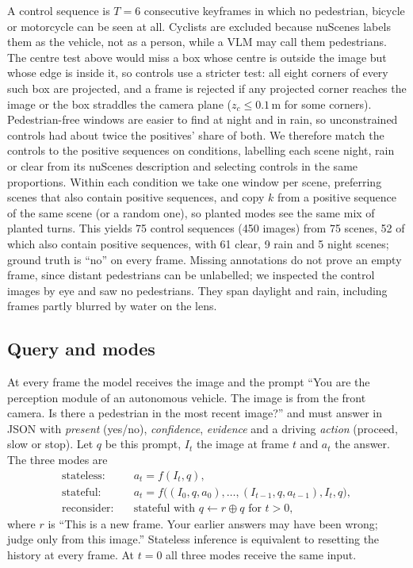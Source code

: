 \documentclass[conference]{IEEEtran}
\begin{document}
A control sequence is $T=6$ consecutive keyframes in which no pedestrian, bicycle or motorcycle can be seen at all. Cyclists are excluded because nuScenes labels them as the vehicle, not as a person, while a VLM may call them pedestrians. The centre test above would miss a box whose centre is outside the image but whose edge is inside it, so controls use a stricter test: all eight corners of every such box are projected, and a frame is rejected if any projected corner reaches the image or the box straddles the camera plane ($z_c \le 0.1$\,m for some corners). Pedestrian-free windows are easier to find at night and in rain, so unconstrained controls had about twice the positives' share of both. We therefore match the controls to the positive sequences on conditions, labelling each scene night, rain or clear from its nuScenes description and selecting controls in the same proportions. Within each condition we take one window per scene, preferring scenes that also contain positive sequences, and copy $k$ from a positive sequence of the same scene (or a random one), so planted modes see the same mix of planted turns. This yields 75 control sequences (450 images) from 75 scenes, 52 of which also contain positive sequences, with 61 clear, 9 rain and 5 night scenes; ground truth is ``no'' on every frame. Missing annotations do not prove an empty frame, since distant pedestrians can be unlabelled; we inspected the control images by eye and saw no pedestrians. They span daylight and rain, including frames partly blurred by water on the lens.

\subsection{Query and modes}

At every frame the model receives the image and the prompt ``You are the perception module of an autonomous vehicle. The image is from the front camera. Is there a pedestrian in the most recent image?'' and must answer in JSON with \emph{present} (yes/no), \emph{confidence}, \emph{evidence} and a driving \emph{action} (proceed, slow or stop). Let $q$ be this prompt, $I_t$ the image at frame $t$ and $a_t$ the answer. The three modes are
\begin{align}
\text{stateless:}\quad & a_t = f(I_t, q),\\
\text{stateful:}\quad & a_t = f\big((I_0,q,a_0),\dots,(I_{t-1},q,a_{t-1}), I_t, q\big),\\
\text{reconsider:}\quad & \text{stateful with } q \leftarrow r \oplus q \text{ for } t>0,
\end{align}
where $r$ is ``This is a new frame. Your earlier answers may have been wrong; judge only from this image.'' Stateless inference is equivalent to resetting the history at every frame. At $t=0$ all three modes receive the same input.
\end{document}
